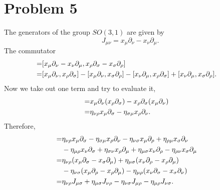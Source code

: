 \documentclass{article}
\begin{document}
\section*{Problem 5}
The generators of the group $SO(3,1)$ are given by
\begin{equation}
    J_{\mu \nu} = x_\mu \partial_\nu -  x_\nu \partial_\mu.
\end{equation}
The commutator
\begin{align}
    [J_{\mu \nu}, J_{\rho \sigma}] =& [x_\mu \partial_\nu - x_\nu
    \partial_\mu, x_\rho \partial_\sigma - x_\sigma \partial_\rho]\cr
    =&[x_\mu \partial_\nu, x_\rho \partial_\sigma]
    -[x_\mu \partial_\nu, x_\sigma \partial_\rho]
    -[x_\nu \partial_\mu, x_\rho \partial_\sigma]
    +[x_\nu\partial_\mu, x_\sigma\partial_\rho].
\end{align}
Now we take out one term and try to evaluate it,
\begin{align}
    [x_\mu \partial_\nu, x_\rho \partial_\sigma]
    =&x_\mu \partial_\nu (x_\rho \partial_\sigma)
    -x_\rho \partial_\sigma(x_\mu \partial_\nu)\cr
    =&\eta_{\nu \rho}x_\mu\partial_\sigma 
    - \eta_{\sigma \mu}x_\rho \partial_\nu.
\end{align}
Therefore,
\begin{align}
    [J_{\mu\nu}, J_{\rho \sigma}] =& \eta_{\nu \rho}x_\mu\partial_\sigma 
    - \eta_{\sigma \mu}x_\rho \partial_\nu
    -\eta_{\nu \sigma} x_\mu \partial_\rho 
    +\eta_{\rho \mu}x_\sigma \partial_\nu\cr
    &-\eta_{\mu \rho}x_\nu \partial_\sigma
    +\eta_{\sigma \nu}x_\rho \partial_\mu
    +\eta_{\mu \sigma}x_\nu \partial_\rho
    -\eta_{\rho \nu}x_\sigma \partial_\mu\cr
    =&\eta_{\nu \rho}(x_\mu \partial_\sigma-x_\sigma \partial_\mu)
    +\eta_{\mu \sigma}(x_\nu \partial_\rho-x_\rho\partial_\mu)\cr
    &-\eta_{\nu \sigma}(x_\mu \partial_\rho-x_\rho \partial_\mu)
    -\eta_{\mu \rho}(x_\nu \partial_\sigma - x_\sigma\partial_\nu)\cr
    =& \eta_{\nu \rho}J_{\mu \sigma} + \eta_{\mu \sigma} J_{\nu \rho}
    -\eta_{\nu \sigma}J_{\mu \rho}-\eta_{\mu \rho}J_{\nu \sigma}.
\end{align}
\end{document}
